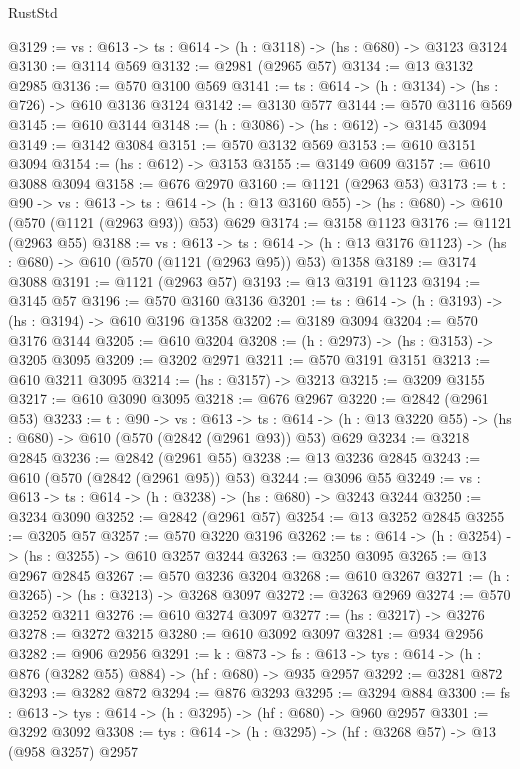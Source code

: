 \begin{lexlean}{RustStd}
\begin{coremodule}
@3129 := {vs : @613} -> {ts : @614} -> (h : @3118) -> (hs : @680) -> @3123 @3124
@3130 := @3114 @569
@3132 := @2981 (@2965 @57)
@3134 := @13 @3132 @2985
@3136 := @570 @3100 @569
@3141 := {ts : @614} -> (h : @3134) -> (hs : @726) -> @610 @3136 @3124
@3142 := @3130 @577
@3144 := @570 @3116 @569
@3145 := @610 @3144
@3148 := (h : @3086) -> (hs : @612) -> @3145 @3094
@3149 := @3142 @3084
@3151 := @570 @3132 @569
@3153 := @610 @3151 @3094
@3154 := (hs : @612) -> @3153
@3155 := @3149 @609
@3157 := @610 @3088 @3094
@3158 := @676 @2970
@3160 := @1121 (@2963 @53)
@3173 := {t : @90} ->
  {vs : @613} ->
  {ts : @614} -> (h : @13 @3160 @55) -> (hs : @680) -> @610 (@570 (@1121 (@2963 @93)) @53) @629
@3174 := @3158 @1123
@3176 := @1121 (@2963 @55)
@3188 := {vs : @613} ->
  {ts : @614} -> (h : @13 @3176 @1123) -> (hs : @680) -> @610 (@570 (@1121 (@2963 @95)) @53) @1358
@3189 := @3174 @3088
@3191 := @1121 (@2963 @57)
@3193 := @13 @3191 @1123
@3194 := @3145 @57
@3196 := @570 @3160 @3136
@3201 := {ts : @614} -> (h : @3193) -> (hs : @3194) -> @610 @3196 @1358
@3202 := @3189 @3094
@3204 := @570 @3176 @3144
@3205 := @610 @3204
@3208 := (h : @2973) -> (hs : @3153) -> @3205 @3095
@3209 := @3202 @2971
@3211 := @570 @3191 @3151
@3213 := @610 @3211 @3095
@3214 := (hs : @3157) -> @3213
@3215 := @3209 @3155
@3217 := @610 @3090 @3095
@3218 := @676 @2967
@3220 := @2842 (@2961 @53)
@3233 := {t : @90} ->
  {vs : @613} ->
  {ts : @614} -> (h : @13 @3220 @55) -> (hs : @680) -> @610 (@570 (@2842 (@2961 @93)) @53) @629
@3234 := @3218 @2845
@3236 := @2842 (@2961 @55)
@3238 := @13 @3236 @2845
@3243 := @610 (@570 (@2842 (@2961 @95)) @53)
@3244 := @3096 @55
@3249 := {vs : @613} -> {ts : @614} -> (h : @3238) -> (hs : @680) -> @3243 @3244
@3250 := @3234 @3090
@3252 := @2842 (@2961 @57)
@3254 := @13 @3252 @2845
@3255 := @3205 @57
@3257 := @570 @3220 @3196
@3262 := {ts : @614} -> (h : @3254) -> (hs : @3255) -> @610 @3257 @3244
@3263 := @3250 @3095
@3265 := @13 @2967 @2845
@3267 := @570 @3236 @3204
@3268 := @610 @3267
@3271 := (h : @3265) -> (hs : @3213) -> @3268 @3097
@3272 := @3263 @2969
@3274 := @570 @3252 @3211
@3276 := @610 @3274 @3097
@3277 := (hs : @3217) -> @3276
@3278 := @3272 @3215
@3280 := @610 @3092 @3097
@3281 := @934 @2956
@3282 := @906 @2956
@3291 := {k : @873} ->
  {fs : @613} -> {tys : @614} -> (h : @876 (@3282 @55) @884) -> (hf : @680) -> @935 @2957
@3292 := @3281 @872
@3293 := @3282 @872
@3294 := @876 @3293
@3295 := @3294 @884
@3300 := {fs : @613} -> {tys : @614} -> (h : @3295) -> (hf : @680) -> @960 @2957
@3301 := @3292 @3092
@3308 := {tys : @614} -> (h : @3295) -> (hf : @3268 @57) -> @13 (@958 @3257) @2957

\end{coremodule}
\end{lexlean}
